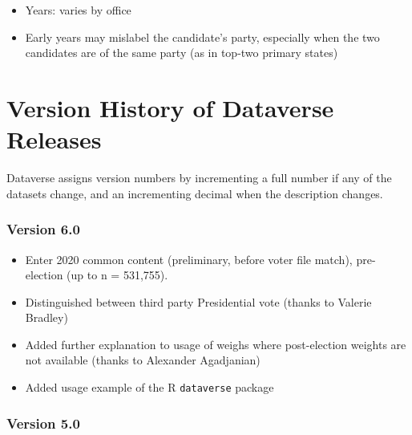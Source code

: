 \documentclass[10pt,article,oneside]{memoir}
\theoremstyle{definition}
\begin{document}
\begin{itemize}
\tightlist
\item
  Years: varies by office
\item
  Early years may mislabel the candidate's party, especially when the
  two candidates are of the same party (as in top-two primary states)
\end{itemize}

\newpage

\hypertarget{version-history-of-dataverse-releases}{%
\section{Version History of Dataverse
Releases}\label{version-history-of-dataverse-releases}}

Dataverse assigns version numbers by incrementing a full number if any
of the datasets change, and an incrementing decimal when the description
changes.

\hypertarget{version-6.0}{%
\subsubsection{Version 6.0}\label{version-6.0}}

\begin{itemize}
\tightlist
\item
  Enter 2020 common content (preliminary, before voter file match),
  pre-election (up to n = 531,755).
\item
  Distinguished between third party Presidential vote (thanks to Valerie
  Bradley)
\item
  Added further explanation to usage of weighs where post-election
  weights are not available (thanks to Alexander Agadjanian)
\item
  Added usage example of the R \texttt{dataverse} package
\end{itemize}

\hypertarget{version-5.0}{%
\subsubsection{Version 5.0}\label{version-5.0}}
\end{document}
